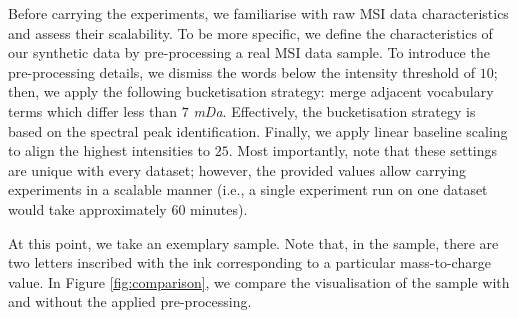 \documentclass{mpaper}
\begin{document}

\par Before carrying the experiments, we familiarise with raw MSI data characteristics and assess their scalability. To be more specific, we define the characteristics of our synthetic data by pre-processing a real MSI data sample. To introduce the pre-processing details, we dismiss the words below the intensity threshold of $10$; then, we apply the following bucketisation strategy: merge adjacent vocabulary terms which differ less than $7$ \textit{mDa}. Effectively, the bucketisation strategy is based on the spectral peak identification. Finally, we apply linear baseline scaling to align the highest intensities to $25$. Most importantly, note that these settings are unique with every dataset; however, the provided values allow carrying experiments in a scalable manner (i.e., a single experiment run on one dataset would take approximately $60$ minutes).

\par At this point, we take an exemplary sample. Note that, in the sample, there are two letters inscribed with the ink corresponding to a particular mass-to-charge value. In Figure \ref{fig:comparison}, we compare the visualisation of the sample with and without the applied pre-processing.
\end{document}
